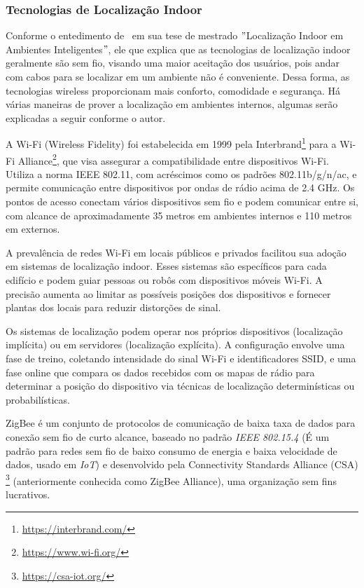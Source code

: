\subsubsection{Tecnologias de Localização Indoor}\label{subsubsec:tecnologias-localizacao-indoor}
Conforme o entedimento de~\cite{novais2014localizaccao} em sua tese de mestrado \("\)Localização Indoor em Ambientes Inteligentes\("\), ele que explica que as tecnologias de localização indoor geralmente são sem fio, visando uma maior aceitação dos usuários, pois andar com cabos para se localizar em um ambiente não é conveniente.
Dessa forma, as tecnologias wireless proporcionam mais conforto, comodidade e segurança.
Há várias maneiras de prover a localização em ambientes internos, algumas serão explicadas a seguir conforme o autor.

\label{subsubsubsec:wifi}
A Wi-Fi (Wireless Fidelity) foi estabelecida em 1999 pela Interbrand\footnote{\url{https://interbrand.com/}} para a Wi-Fi Alliance\footnote{\url{https://www.wi-fi.org/}}, que visa assegurar a compatibilidade entre dispositivos Wi-Fi. Utiliza a norma IEEE 802.11, com acréscimos como os padrões 802.11b/g/n/ac, e permite comunicação entre dispositivos por ondas de rádio acima de 2.4 GHz. Os pontos de acesso conectam vários dispositivos sem fio e podem comunicar entre si, com alcance de aproximadamente 35 metros em ambientes internos e 110 metros em externos.

A prevalência de redes Wi-Fi em locais públicos e privados facilitou sua adoção em sistemas de localização indoor.
Esses sistemas são específicos para cada edifício e podem guiar pessoas ou robôs com dispositivos móveis Wi-Fi. A precisão aumenta ao limitar as possíveis posições dos dispositivos e fornecer plantas dos locais para reduzir distorções de sinal.

Os sistemas de localização podem operar nos próprios dispositivos (localização implícita) ou em servidores (localização explícita).
A configuração envolve uma fase de treino, coletando intensidade do sinal Wi-Fi e identificadores SSID, e uma fase online que compara os dados recebidos com os mapas de rádio para determinar a posição do dispositivo via técnicas de localização determinísticas ou probabilísticas.

\label{subsubsubsec:zigbee}
ZigBee é um conjunto de protocolos de comunicação de baixa taxa de dados para conexão sem fio de curto alcance, baseado no padrão \textit{IEEE 802.15.4} (É um padrão para redes sem fio de baixo consumo de energia e baixa velocidade de dados, usado em \textit{IoT}) e desenvolvido pela Connectivity Standards Alliance (CSA) \footnote{\url{https://csa-iot.org/}} (anteriormente conhecida como ZigBee Alliance), uma organização sem fins lucrativos.

